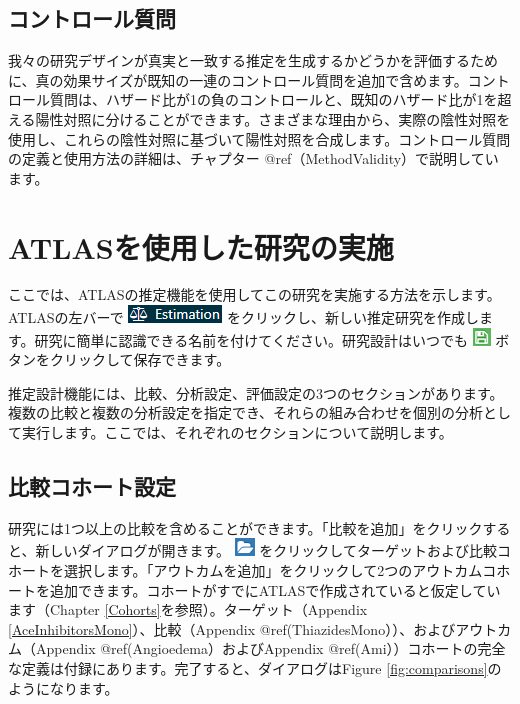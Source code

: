 \documentclass[
  11pt]{book}
\theoremstyle{definition}
\theoremstyle{definition}
\theoremstyle{definition}
\theoremstyle{definition}
\theoremstyle{remark}
\begin{document}
\subsection{コントロール質問}\label{ux30b3ux30f3ux30c8ux30edux30fcux30ebux8ceaux554f}

我々の研究デザインが真実と一致する推定を生成するかどうかを評価するために、真の効果サイズが既知の一連のコントロール質問を追加で含めます。コントロール質問は、ハザード比が1の負のコントロールと、既知のハザード比が1を超える陽性対照に分けることができます。さまざまな理由から、実際の陰性対照を使用し、これらの陰性対照に基づいて陽性対照を合成します。コントロール質問の定義と使用方法の詳細は、チャプター @ref（MethodValidity）で説明しています。

\section{ATLASを使用した研究の実施}\label{PleAtlas}

ここでは、ATLASの推定機能を使用してこの研究を実施する方法を示します。ATLASの左バーで \includegraphics{images/PopulationLevelEstimation/estimation.png} をクリックし、新しい推定研究を作成します。研究に簡単に認識できる名前を付けてください。研究設計はいつでも \includegraphics{images/PopulationLevelEstimation/save.png} ボタンをクリックして保存できます。

推定設計機能には、比較、分析設定、評価設定の3つのセクションがあります。複数の比較と複数の分析設定を指定でき、それらの組み合わせを個別の分析として実行します。ここでは、それぞれのセクションについて説明します。

\subsection{比較コホート設定}\label{ComparisonSettings}

研究には1つ以上の比較を含めることができます。「比較を追加」をクリックすると、新しいダイアログが開きます。 \includegraphics{images/PopulationLevelEstimation/open.png} をクリックしてターゲットおよび比較コホートを選択します。「アウトカムを追加」をクリックして2つのアウトカムコホートを追加できます。コホートがすでにATLASで作成されていると仮定しています（Chapter \ref{Cohorts}を参照）。ターゲット（Appendix \ref{AceInhibitorsMono}）、比較（Appendix @ref(ThiazidesMono））、およびアウトカム（Appendix @ref(Angioedema）およびAppendix @ref(Ami））コホートの完全な定義は付録にあります。完了すると、ダイアログはFigure \ref{fig:comparisons}のようになります。
\end{document}
